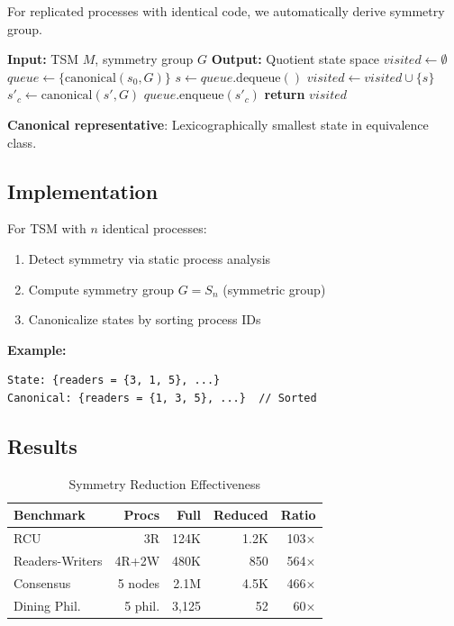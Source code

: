 \documentclass[conference]{IEEEtran}
\begin{document}
For replicated processes with identical code, we automatically derive symmetry group.

\begin{algorithm}
\caption{Symmetry Reduction (Quotient Construction)}
\label{alg:symmetry}
\begin{algorithmic}
\STATE \textbf{Input:} TSM $M$, symmetry group $G$
\STATE \textbf{Output:} Quotient state space
\STATE
\STATE $visited \gets \emptyset$
\STATE $queue \gets \{\text{canonical}(s_0, G)\}$
  \STATE $s \gets queue.\text{dequeue}()$
  \STATE $visited \gets visited \cup \{s\}$
    \STATE $s'_c \gets \text{canonical}(s', G)$ 
      \STATE $queue.\text{enqueue}(s'_c)$
    \ENDIF
  \ENDFOR
\ENDWHILE
\STATE \textbf{return} $visited$
\end{algorithmic}
\end{algorithm}

\textbf{Canonical representative}: Lexicographically smallest state in equivalence class.

\subsection{Implementation}

For TSM with $n$ identical processes:
\begin{enumerate}
\item Detect symmetry via static process analysis
\item Compute symmetry group $G = S_n$ (symmetric group)
\item Canonicalize states by sorting process IDs
\end{enumerate}

\textbf{Example:}
\begin{lstlisting}
State: {readers = {3, 1, 5}, ...}
Canonical: {readers = {1, 3, 5}, ...}  // Sorted
\end{lstlisting}

\subsection{Results}

\begin{table}[h]
\centering
\caption{Symmetry Reduction Effectiveness}
\label{tab:symmetry_results}
\begin{tabular}{lrrrr}
\toprule
\textbf{Benchmark} & \textbf{Procs} & \textbf{Full} & \textbf{Reduced} & \textbf{Ratio} \\
\midrule
RCU & 3R & 124K & 1.2K & 103× \\
Readers-Writers & 4R+2W & 480K & 850 & 564× \\
Consensus & 5 nodes & 2.1M & 4.5K & 466× \\
Dining Phil. & 5 phil. & 3,125 & 52 & 60× \\
\bottomrule
\end{tabular}
\end{table}
\end{document}
